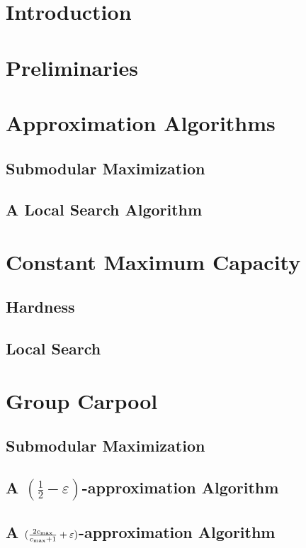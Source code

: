 \begin{abstract}

\end{abstract}

\section{Introduction}


\section{Preliminaries}
\label{sec:pre}


\section{Approximation Algorithms}
\label{sec:approx}


\subsection{Submodular Maximization}
\label{sec:sub}


\subsection{A Local Search Algorithm}


\section{Constant Maximum Capacity}

	\subsection{Hardness}
	\label{sec:hardness}
	

	\subsection{Local Search}
	\label{sec:local}
	

\section{Group Carpool}
\label{sec:group}

	\subsection{Submodular Maximization}
	
	
	\subsection{A $(\frac{1}{2} - \varepsilon)$-approximation Algorithm}
	
	
	\subsection{A $(\frac{2c_{\max}}{c_{\max}+1} + \varepsilon)$-approximation Algorithm}
	


